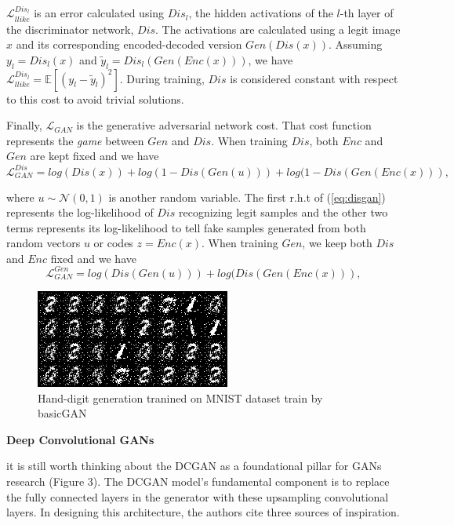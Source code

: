 \documentclass{article}
\begin{document}
$\mathcal{L}_{llike}^{Dis_l}$ is an error calculated using $Dis_l$, the hidden activations of the $l$-th layer of the discriminator network, $Dis$.
The activations are calculated using a legit image $x$ and its corresponding encoded-decoded version $Gen(Dis(x))$. Assuming $y_l = Dis_l(x)$ and
$\tilde{y}_l = Dis_l(Gen(Enc(x)))$, we have $\mathcal{L}_{llike}^{Dis_l} = \mathbb{E}\left[ (y_l - \tilde{y}_l)^2 \right]$. During training, $Dis$
is considered constant with respect to this cost to avoid trivial solutions.

Finally, $\mathcal{L}_{GAN}$ is the generative adversarial network cost. That cost function represents the \textit{game} between $Gen$ and $Dis$.
When training $Dis$, both $Enc$ and $Gen$ are kept fixed and we have
\begin{equation}
 \label{eq:disgan}
 \mathcal{L}_{GAN}^{Dis} = log(Dis(x)) + log(1 - Dis(Gen(u))) + log(1 - Dis(Gen(Enc(x))),
\end{equation}

where $u \sim \mathcal{N}(0, 1)$ is another random variable. The first r.h.t of (\ref{eq:disgan}) represents the log-likelihood of $Dis$ recognizing legit samples
and the other two terms represents its log-likelihood to tell fake samples generated from both random vectors $u$ or codes $z=Enc(x)$.
When training $Gen$, we keep both $Dis$ and $Enc$ fixed and we have
\begin{equation}
 \label{eq:gengan}
 \mathcal{L}_{GAN}^{Gen} = log(Dis(Gen(u))) + log(Dis(Gen(Enc(x))),
\end{equation}

\begin{figure}[h]
    \centering
    \includegraphics[width=.6\textwidth]{images/basicgan_result.png}
    \caption{Hand-digit generation tranined on MNIST dataset train by basicGAN}
    \label{fig:mesh1}
\end{figure}



\medskip
\begin{center}
    {\Large{\textbf{Deep Convolutional GANs}}}
\end{center}
it is still worth thinking about the DCGAN as a foundational pillar for GANs research (Figure 3). The DCGAN model’s fundamental component is to replace the fully connected layers in the generator with these upsampling convolutional layers. In designing this architecture, the authors cite three sources of inspiration.
\end{document}
